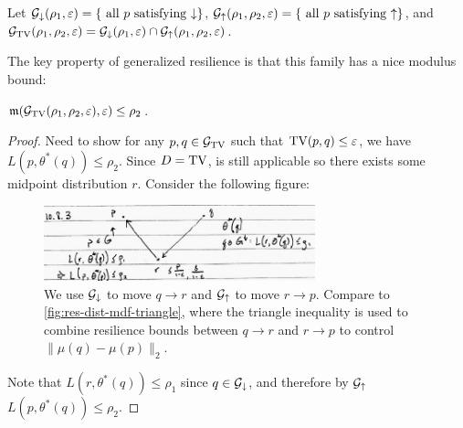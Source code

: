 \begin{definition}
  Let $\mathcal{G}_{\downarrow}(\rho_1, \varepsilon) = \{\text{ all $p$ satisfying $\downarrow$}\}$,
  $\mathcal{G}_{\uparrow}(\rho_1, \rho_2, \varepsilon) = \{\text{ all $p$ satisfying $\uparrow$}\}$,
  and
  $\mathcal{G}_{\operatorname{TV}}(\rho_1, \rho_2, \varepsilon) = \mathcal{G}_{\downarrow}(\rho_1, \varepsilon) \cap \mathcal{G}_{\uparrow}(\rho_1, \rho_2, \varepsilon)$.
\end{definition}

The key property of generalized resilience is that this family has a nice modulus
bound:
\begin{proposition}
  $\mathfrak{m}(\mathcal{G}_{\operatorname{TV}}(\rho_1, \rho_2, \varepsilon), \varepsilon) \leq \rho_2$.
\end{proposition}

\begin{proof}
  Need to show for any $p, q \in \mathcal{G}_{\operatorname{TV}}$ such that $\operatorname{TV}(p, q) \leq \varepsilon$, we have
  $L(p, \theta^*(q)) \leq \rho_2$.
  Since $D = \operatorname{TV}$,  is still applicable so there exists
  some midpoint distribution $r$.
  Consider the following figure:
  \begin{figure}[H]
    \begin{center}
      \includegraphics[width=0.7\textwidth]{figures/10-8-3.png}
    \end{center}
    \caption{
      We use $\mathcal{G}_\downarrow$ to move $q \to r$
      and $\mathcal{G}_\uparrow$ to move $r \to p$.
      Compare to \cref{fig:res-dist-mdf-triangle},
      where the triangle inequality is used to combine
      resilience bounds between $q \to r$ and $r \to p$
      to control $\|\mu(q) - \mu(p)\|_2$.
  }
  \end{figure}
  Note that $L(r, \theta^*(q)) \leq \rho_1$ since $q \in \mathcal{G}_\downarrow$,
  and therefore by $\mathcal{G}_\uparrow$ $L(p, \theta^*(q)) \leq \rho_2$.
\end{proof}

